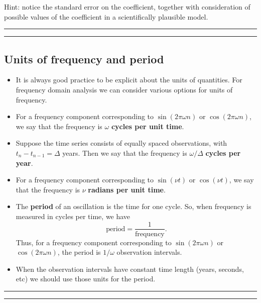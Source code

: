 \documentclass[]{article}
\begin{document}
Hint: notice the standard error on the coefficient, together with
consideration of possible values of the coefficient in a scientifically
plausible model.

\begin{center}\rule{0.5\linewidth}{\linethickness}\end{center}

\begin{center}\rule{0.5\linewidth}{\linethickness}\end{center}

\subsection{Units of frequency and
period}\label{units-of-frequency-and-period}

\begin{itemize}
\item
  It is always good practice to be explicit about the units of
  quantities. For frequency domain analysis we can consider various
  options for units of frequency.
\item
  For a frequency component corresponding to \(\sin(2\pi\omega n)\) or
  \(\cos(2\pi\omega n)\), we say that the frequency is \(\omega\)
  \textbf{cycles per unit time}.
\item
  Suppose the time series consists of equally spaced observations, with
  \(t_{n}-t_{n-1}=\Delta\) years. Then we say that the frequency is
  \(\omega/\Delta\) \textbf{cycles per year}.
\item
  For a frequency component corresponding to \(\sin(\nu t)\) or
  \(\cos(\nu t)\), we say that the frequency is \(\nu\) \textbf{radians
  per unit time}.
\item
  The \textbf{period} of an oscillation is the time for one cycle. So,
  when frequency is measured in cycles per time, we have
  \[ \mbox{period} = \frac{1}{\mbox{frequency}}.\] Thus, for a frequency
  component corresponding to \(\sin(2\pi\omega n)\) or
  \(\cos(2\pi\omega n)\), the period is \(1/\omega\) observation
  intervals.
\item
  When the observation intervals have constant time length (years,
  seconds, etc) we should use those units for the period.
\end{itemize}

\begin{center}\rule{0.5\linewidth}{\linethickness}\end{center}

\begin{center}\rule{0.5\linewidth}{\linethickness}\end{center}
\end{document}

